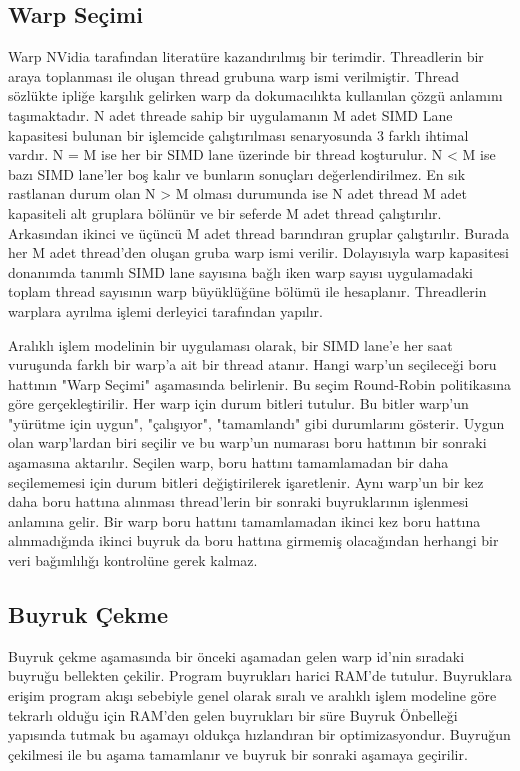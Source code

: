 \subsection{Warp Seçimi}
Warp NVidia tarafından literatüre kazandırılmış bir terimdir. Threadlerin bir araya toplanması ile oluşan thread grubuna warp ismi verilmiştir. Thread sözlükte ipliğe karşılık gelirken warp da dokumacılıkta kullanılan çözgü anlamını taşımaktadır. N adet threade sahip bir uygulamanın M adet SIMD Lane kapasitesi bulunan bir işlemcide çalıştırılması senaryosunda 3 farklı ihtimal vardır. N = M ise her bir SIMD lane üzerinde bir thread koşturulur. N < M ise bazı SIMD lane'ler boş kalır ve bunların sonuçları değerlendirilmez. En sık rastlanan durum olan N > M olması durumunda ise N adet thread M adet kapasiteli alt gruplara bölünür ve bir seferde M adet thread çalıştırılır. Arkasından ikinci ve üçüncü M adet thread barındıran gruplar çalıştırılır. Burada her M adet thread'den oluşan gruba warp ismi verilir. Dolayısıyla warp kapasitesi donanımda tanımlı SIMD lane sayısına bağlı iken warp sayısı uygulamadaki toplam thread sayısının warp büyüklüğüne bölümü ile hesaplanır. Threadlerin warplara ayrılma işlemi derleyici tarafından yapılır.\par 
Aralıklı işlem modelinin bir uygulaması olarak, bir SIMD lane'e her saat vuruşunda farklı bir warp'a ait bir thread atanır. Hangi warp'un seçileceği boru hattının "Warp Seçimi" aşamasında belirlenir. Bu seçim Round-Robin politikasına göre gerçekleştirilir. Her warp için durum bitleri tutulur. Bu bitler warp'un "yürütme için uygun", "çalışıyor", "tamamlandı" gibi durumlarını gösterir. Uygun olan warp'lardan biri seçilir ve bu warp'un numarası boru hattının bir sonraki aşamasına aktarılır. Seçilen warp, boru hattını tamamlamadan bir daha seçilememesi için durum bitleri değiştirilerek işaretlenir. Aynı warp'un bir kez daha boru hattına alınması thread'lerin bir sonraki buyruklarının işlenmesi anlamına gelir. Bir warp boru hattını tamamlamadan ikinci kez boru hattına alınmadığında ikinci buyruk da boru hattına girmemiş olacağından herhangi bir veri bağımlılığı kontrolüne gerek kalmaz.\par
\subsection{Buyruk Çekme}
Buyruk çekme aşamasında bir önceki aşamadan gelen warp id'nin sıradaki buyruğu bellekten çekilir. Program buyrukları harici RAM’de tutulur. Buyruklara erişim program akışı sebebiyle genel olarak sıralı ve aralıklı işlem modeline göre tekrarlı olduğu için RAM’den gelen buyrukları bir süre Buyruk Önbelleği yapısında tutmak bu aşamayı oldukça hızlandıran bir optimizasyondur. Buyruğun çekilmesi ile bu aşama tamamlanır ve buyruk bir sonraki aşamaya geçirilir.
